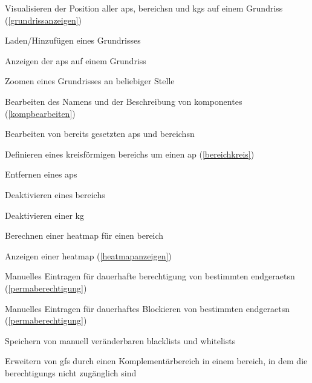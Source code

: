 \begin{ofalist}
	\item \label{favisualisieren} Visualisieren der Position aller \glspl{ap}, \glspl{bereich}n und \glspl{kg} auf einem Grundriss (\ref{grundrissanzeigen})
	\begin{ofalist}
		\item \label{fagebplanladen} Laden/Hinzufügen eines Grundrisses
		\item \label{fagebplananzeigen} Anzeigen der \glspl{ap} auf einem Grundriss
		\item \label{fazoomen} Zoomen eines Grundrisses an beliebiger Stelle
	\end{ofalist}	
	\item \label{fanamebeschreibungbearbeiten} Bearbeiten des Namens und der Beschreibung von \glspl{komponente} (\ref{kompbearbeiten})
	\item \label{oakomponentenbearbeiten} Bearbeiten von bereits gesetzten \glspl{ap} und \glspl{bereich}n
	\item \label{bereichkreisfoermig} Definieren eines kreisförmigen \gls{bereich}s um einen \gls{ap} (\ref{bereichkreis})
	\item \label{oaaploeschen} Entfernen eines \glspl{ap}
	\item \label{fadeaktivierenbereich} Deaktivieren eines \gls{bereich}s
	\item \label{oadeaktivierenkg} Deaktivieren einer \gls{kg}
	\item \label{oaheatmapberechnen} Berechnen einer \gls{heatmap} für einen \gls{bereich}
	\item \label{oaheatmap} Anzeigen einer \gls{heatmap} (\ref{heatmapanzeigen})
	\item \label{oaberechtigungmanuell} Manuelles Eintragen für dauerhafte \gls{berechtigung} von bestimmten \glspl{endgeraet}n (\ref{permaberechtigung})
	\item \label{oablockierenmanuell} Manuelles Eintragen für dauerhaftes Blockieren von bestimmten \glspl{endgeraet}n (\ref{permaberechtigung})
	\item \label{oamanuellelistenspeichern} Speichern von manuell veränderbaren \glspl{blacklist} und \glspl{whitelist}
	\item \label{oakomplementaerbereich} Erweitern von \glspl{gf} durch einen Komplementärbereich in einem \gls{bereich}, in dem die \glspl{berechtigung} nicht zugänglich sind
\end{ofalist}